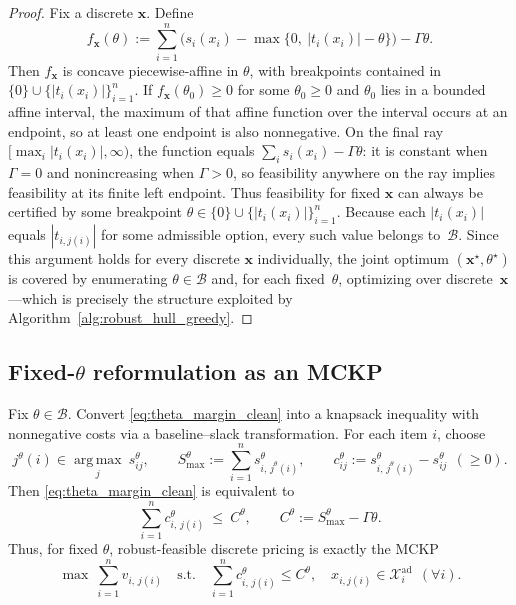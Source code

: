 \documentclass[11pt, a4paper]{article}
\theoremstyle{plain}
\theoremstyle{definition}
\theoremstyle{remark}
\begin{document}
\begin{proof}
Fix a discrete $\bm x$. Define
\[
f_{\bm x}(\theta)
:=\sum_{i=1}^n\Big(s_i(x_i)-\max\{0,\ |t_i(x_i)|-\theta\}\Big)-\Gamma\theta.
\]
Then $f_{\bm x}$ is concave piecewise-affine in $\theta$, with breakpoints contained in $\{0\}\cup\{|t_i(x_i)|\}_{i=1}^n$.
If $f_{\bm x}(\theta_0)\ge 0$ for some $\theta_0\ge 0$ and $\theta_0$ lies in a bounded affine interval, the maximum of that affine
function over the interval occurs at an endpoint, so at least one endpoint is also nonnegative.  On the final ray
$[\max_i|t_i(x_i)|,\infty)$, the function equals $\sum_i s_i(x_i)-\Gamma\theta$: it is constant when $\Gamma=0$ and nonincreasing when
$\Gamma>0$, so feasibility anywhere on the ray implies feasibility at its finite left endpoint.  Thus feasibility for fixed $\bm x$ can
always be certified by some breakpoint $\theta\in\{0\}\cup\{|t_i(x_i)|\}_{i=1}^n$. Because each $|t_i(x_i)|$ equals $|t_{i,j(i)}|$ for some admissible option,
every such value belongs to~$\mathcal B$. Since this argument holds for every discrete $\bm x$ individually, the joint optimum
$(\bm x^\star,\theta^\star)$ is covered by enumerating $\theta\in\mathcal B$ and, for each fixed~$\theta$, optimizing over discrete~$\bm x$---which is precisely the structure exploited by Algorithm~\ref{alg:robust_hull_greedy}.
\end{proof}

\subsection{Fixed-\texorpdfstring{$\theta$}{theta} reformulation as an MCKP}\label{subsec:theta_mckp}

Fix $\theta\in\mathcal B$. Convert \eqref{eq:theta_margin_clean} into a knapsack inequality with nonnegative costs via a baseline--slack
transformation. For each item $i$, choose
\[
j^\theta(i)\in\operatorname*{arg\,max}_{j}\ s^\theta_{ij},\qquad
S^\theta_{\max}:=\sum_{i=1}^n s^\theta_{i,\,j^\theta(i)},\qquad
c^\theta_{ij}:=s^\theta_{i,\,j^\theta(i)}-s^\theta_{ij}\ \ (\ge 0).
\]
Then \eqref{eq:theta_margin_clean} is equivalent to
\begin{equation}\label{eq:theta_knapsack_clean}
\sum_{i=1}^n c^\theta_{i,\,j(i)}\ \le\ C^\theta,
\qquad
C^\theta:=S^\theta_{\max}-\Gamma\theta.
\end{equation}
Thus, for fixed $\theta$, robust-feasible discrete pricing is exactly the MCKP
\begin{equation}\label{eq:mckp_theta_clean}
\max \ \sum_{i=1}^n v_{i,\,j(i)}
\quad\text{s.t.}\quad
\sum_{i=1}^n c^\theta_{i,\,j(i)}\le C^\theta,
\quad
x_{i,j(i)}\in\mathcal X_i^{\mathrm{ad}}\ \ (\forall i).
\end{equation}
\end{document}
